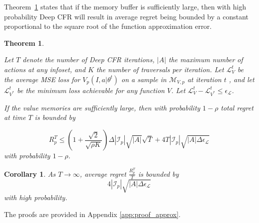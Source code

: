 \documentclass{article}
\newtheorem{theorem}{Theorem}
\newtheorem{corollary}{Corollary}
\begin{document}


Theorem~\ref{th:deepcfr_approx} states that if the memory buffer is sufficiently large, then with high probability Deep CFR will result in average regret being bounded by a constant proportional to the square root of the function approximation error.

\newcommand{\norm}[1]{\left\lVert#1\right\rVert}

\begin{theorem}
\label{th:deepcfr_approx}

Let $T$ denote the number of Deep CFR iterations, $|A|$ the maximum number of actions at any infoset, and $K$ the number of traversals per iteration. Let $\mathcal{L}^t_V$ be the average MSE loss for $V_p(I,a|\theta^t)$ on a sample in $\mathcal{M}_{V,p}$ at iteration $t$ , and let $\mathcal{L}^t_{V^*}$ be the minimum loss achievable for any function $V$. Let $\mathcal{L}^t_V - \mathcal{L}^t_{V^*} \leq \epsilon_\mathcal{L}$.

If the value memories are sufficiently large, then with probability $1-\rho $ total regret at time $T$ is bounded by

\begin{equation}
    R_p^T \leq \left( 1 + \frac{\sqrt{2}}{\sqrt{\rho K}} \right) \Delta |\mathcal{I}_p| \sqrt{|A|}\sqrt{T} +  4T |\mathcal{I}_p| \sqrt{|A| \Delta  \epsilon_\mathcal{L}}
\end{equation}
with probability $1-\rho$.


\end{theorem}


\begin{corollary}
\label{cor:deepcfr_approx}
As $T\to \infty$, average regret $\frac{R^T_p}{T}$ is bounded by $$ 4 |\mathcal{I}_p| \sqrt{|A| \Delta \epsilon_\mathcal{L}}$$ with high probability.
\end{corollary}

The proofs are provided in Appendix \ref{app:proof_approx}. 


\end{document}
